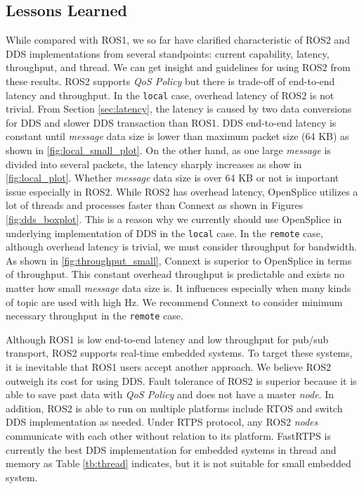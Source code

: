\documentclass{sig-alternate-05-2015}
\begin{document}
\subsection{Lessons Learned}
\label{sec:lessons}
While compared with ROS1, we so far have clarified characteristic of ROS2 and DDS implementations from several standpoints: current capability, latency, throughput, and thread.
We can get insight and guidelines for using ROS2 from these results.
ROS2 supports \emph{QoS Policy} but there is trade-off of end-to-end latency and throughput.
In the \texttt{local} case, overhead latency of ROS2 is not trivial.
From Section \ref{sec:latency}, the latency is caused by two data conversions for DDS and slower DDS transaction than ROS1.
DDS end-to-end latency is constant until \emph{message} data size is lower than maximum packet size (64 KB) as shown in \ref{fig:local_small_plot}.
On the other hand, as one large \emph{message} is divided into several packets, the latency sharply increases as show in \ref{fig:local_plot}.
Whether \emph{message} data size is over 64 KB or not is important issue especially in ROS2.
While ROS2 has overhead latency, OpenSplice utilizes a lot of threads and processes faster than Connext as shown in Figures \ref{fig:dds_boxplot}.
This is a reason why we currently should use OpenSplice in underlying implementation of DDS in the \texttt{local} case.
In the \texttt{remote} case, although overhead latency is trivial, we must consider throughput for bandwidth.
As shown in \ref{fig:throughput_small}, Connext is superior to OpenSplice in terms of throughput.
This constant overhead throughput is predictable and exists no matter how small \emph{message} data size is.
It influences especially when many kinds of topic are used with high Hz.
We recommend Connext to consider minimum necessary throughput in the \texttt{remote} case.

Although ROS1 is low end-to-end latency and low throughput for pub/sub transport, ROS2 supports real-time embedded systems.
To target these systems, it is inevitable that ROS1 users accept another approach.
We believe ROS2 outweigh its cost for using DDS.
Fault tolerance of ROS2 is superior because it is able to save past data with \emph{QoS Policy} and does not have a master \emph{node}.
In addition, ROS2 is able to run on multiple platforms include RTOS and switch DDS implementation as needed.
Under RTPS protocol, any ROS2 \emph{nodes} communicate with each other without relation to its platform.
FastRTPS is currently the best DDS implementation for embedded systems in thread and memory as Table \ref{tb:thread} indicates, but it is not suitable for small embedded system.
\end{document}

